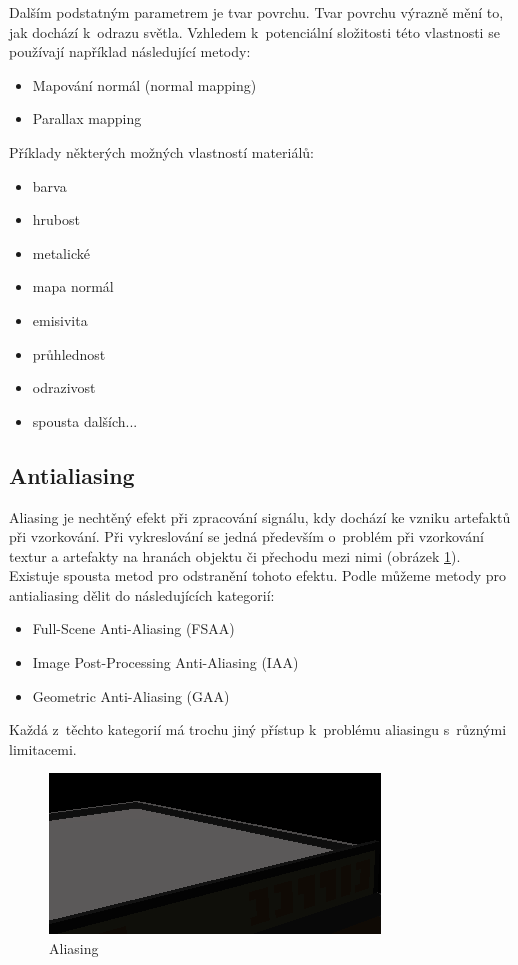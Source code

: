 Dalším podstatným parametrem je tvar povrchu. Tvar povrchu výrazně mění to, jak dochází k~odrazu světla. Vzhledem k~potenciální složitosti této vlastnosti se používají například následující metody:

\begin{itemize}
	\item Mapování normál (normal mapping)
	\item Parallax mapping
\end{itemize}

Příklady některých možných vlastností materiálů:

\begin{itemize}
	\item barva
	\item hrubost
	\item metalické
	\item mapa normál
	\item emisivita
	\item průhlednost
	\item odrazivost
	\item spousta dalších...
\end{itemize}


\subsection{Antialiasing}
Aliasing je nechtěný efekt při zpracování signálu, kdy dochází ke vzniku artefaktů při vzorkování. Při vykreslování se jedná především o~problém při vzorkování textur a artefakty na hranách objektu či přechodu mezi nimi (obrázek \ref{fig:aliasing}). Existuje spousta metod pro odstranění tohoto efektu. Podle \cite{aa_survey} můžeme metody pro antialiasing dělit do následujících kategorií:

\begin{itemize}
	\item Full-Scene Anti-Aliasing (FSAA)
	\item Image Post-Processing Anti-Aliasing (IAA)
	\item Geometric Anti-Aliasing (GAA)
\end{itemize}

Každá z~těchto kategorií má trochu jiný přístup k~problému aliasingu s~různými limitacemi.

\begin{figure}[H]
	\centering
	\includegraphics[scale=2]{obrazky-figures/aliasing.png}
	\caption{Aliasing}
	\label{fig:aliasing}
\end{figure}

